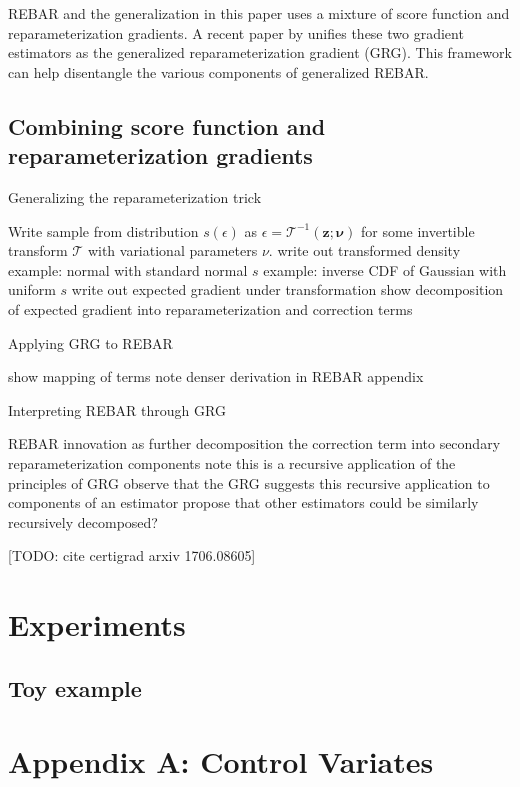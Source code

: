 \documentclass{article}
\begin{document}


REBAR and the generalization in this paper uses a mixture of score function and reparameterization gradients.
A recent paper by \cite{ruiz2016generalized} unifies these two gradient estimators as the generalized reparameterization gradient (GRG).
This framework can help disentangle the various components of generalized REBAR.

\subsection{Combining score function and reparameterization gradients}

\par{Generalizing the reparameterization trick}

Write sample from distribution $s(\epsilon)$ as $\epsilon = \mathcal{T}^{-1}(\mathbf{z}; \mathbf{\nu})$ for some invertible transform $\mathcal{T}$ with variational parameters $\nu$.
write out transformed density
example: normal with standard normal $s$
example: inverse CDF of Gaussian with uniform $s$
write out expected gradient under transformation
show decomposition of expected gradient into reparameterization and correction terms 

\par{Applying GRG to REBAR}

show mapping of terms
note denser derivation in REBAR appendix

\par{Interpreting REBAR through GRG}

REBAR innovation as further decomposition the correction term into secondary reparameterization components
note this is a recursive application of the principles of GRG
observe that the GRG suggests this recursive application to components of an estimator
propose that other estimators could be similarly recursively decomposed?



[TODO: cite certigrad arxiv 1706.08605]


\section{Experiments}
\subsection{Toy example}






\section{Appendix A: Control Variates}
\end{document}
